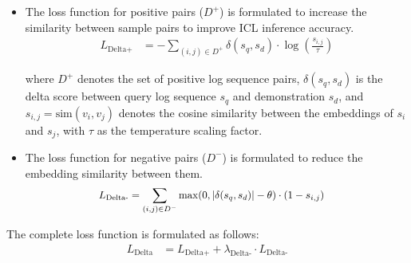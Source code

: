 \documentclass[lettersize,journal]{IEEEtran}
\begin{document}
\begin{itemize}
\item The loss function for positive pairs ($D^+$) is formulated to increase the similarity between sample pairs to improve ICL inference accuracy.
    \begin{equation}
    \label{eq: pos_delta_loss}
    \begin{aligned}
    L_{\text{Delta+}} &= -\sum_{(i,j) \in D^+} \delta(s_q, s_d) \cdot \log \left( \frac{s_{i,j}}{\tau} \right)
    \end{aligned}
    \end{equation}
    
    where $D^+$ denotes the set of positive log sequence pairs, $\delta(s_q, s_d)$ is the delta score between query log sequence $s_q$ and demonstration $s_d$, and $s_{i,j} = \text{sim}(v_i, v_j)$ denotes the cosine similarity between the embeddings of $s_i$ and $s_j$, with $\tau$ as the temperature scaling factor.

\item The loss function for negative pairs ($D^-$) is formulated to reduce the embedding similarity between them.
    \begin{equation}
    \label{eq: neg_delta_loss}
    \scalebox{0.93}{$
    \begin{aligned}
    L_{\text{Delta-}} &= \sum_{(i,j) \in D^-} \max(0, |\delta(s_q, s_d)| - \theta) \cdot (1 - s_{i,j})
    \end{aligned}
    $}
    \end{equation}
    
  \end{itemize}
The complete loss function is formulated as follows:
    \begin{equation}
    \label{eq:delta_loss}
    \begin{aligned}
    L_{\text{Delta}} &= L_{\text{Delta+}} + \lambda_{\text{Delta-}} \cdot L_{\text{Delta-}}
    \end{aligned}
    \end{equation}
\end{document}
